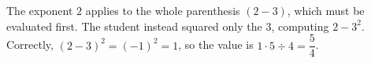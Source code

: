 The exponent $2$ applies to the whole parenthesis $(2-3)$, which must be evaluated first. The student instead squared only the $3$, computing $2-3^2$. Correctly, $(2-3)^2=(-1)^2=1$, so the value is $1\cdot5\div4=\boxed{\dfrac54}$.
